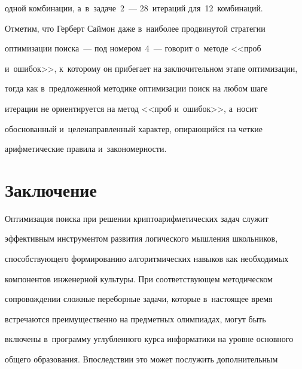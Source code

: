 одной комбинации, а~в~задаче~2~--- 28~итераций для~12~комбинаций. 


    


    Отметим, что Герберт Саймон даже в~наиболее продвинутой стратегии 


оптимизации поиска~--- под номером~4~--- говорит о~методе <<проб 


и~ошибок>>, к~которому он прибегает на заключительном этапе оптимизации,


тогда как в~предложенной методике оптимизации поиск на любом шаге 


итерации не ориентируется на метод <<проб и~ошибок>>, а~носит 


обоснованный и~целенаправленный характер, опирающийся на четкие 


арифметические правила и~закономерности. 





\vspace*{-6pt}





\section{Заключение}








\vspace*{-4pt}





    Оптимизация поиска при решении криптоарифметических задач служит 


эффективным инструментом развития логического мышления школьников, 


способствующего формированию алгоритмических навыков как необходимых 


компонентов инженерной культуры. При соответствующем методическом 


\mbox{сопровождении} сложные переборные задачи, которые в~настоящее время 


встречаются преимущественно на предметных олимпиадах, могут быть 


включены в~программу углубленного курса информатики на уровне основного 


общего образования. Впоследствии это может послужить дополнительным 


